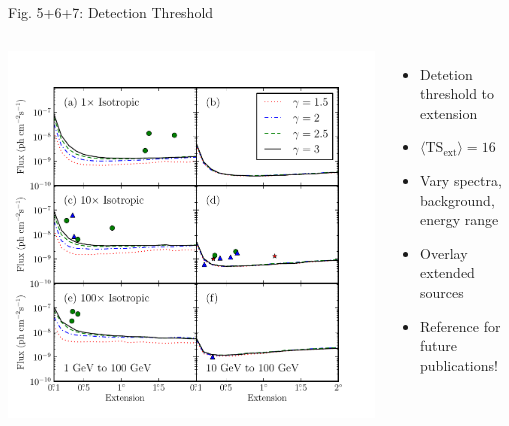 \documentclass[12pt]{beamer}
\begin{document}
\begin{frame}{Fig. 5+6+7: Detection Threshold}
  \begin{columns}
    \includegraphics[scale=0.5]{plots/all_sensitivity_color.pdf}
    \begin{itemize}
      \item Detetion threshold to extension
      \item $\langle\text{TS}_\text{ext}\rangle=16$
      \item Vary spectra, background, energy range
      \item Overlay extended sources
      \item Reference for future publications!
    \end{itemize}
  \end{columns}
\end{frame}
\end{document}
